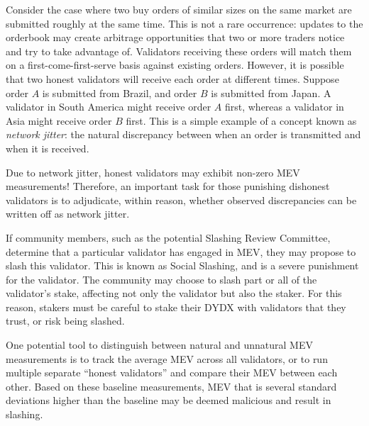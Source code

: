            Consider the case where two buy orders of similar sizes on the same market are submitted roughly at the same time. This is not a rare occurrence: updates to the orderbook may create arbitrage opportunities that two or more traders notice and try to take advantage of. Validators receiving these orders will match them on a first-come-first-serve basis against existing orders. However, it is possible that two honest validators will receive each order at different times. Suppose order $A$ is submitted from Brazil, and order $B$ is submitted from Japan. A validator in South America might receive order $A$ first, whereas a validator in Asia might receive order $B$ first. This is a simple example of a concept known as \textit{network jitter}: the natural discrepancy between when an order is transmitted and when it is received.

            Due to network jitter, honest validators may exhibit non-zero MEV measurements! Therefore, an important task for those punishing dishonest validators is to adjudicate, within reason, whether observed discrepancies can be written off as network jitter.

            If community members, such as the potential Slashing Review Committee, determine that a particular validator has engaged in MEV, they may propose to slash this validator. This is known as Social Slashing, and is a severe punishment for the validator. The community may choose to slash part or all of the validator's stake, affecting not only the validator but also the staker. For this reason, stakers must be careful to stake their DYDX with validators that they trust, or risk being slashed.

            One potential tool to distinguish between natural and unnatural MEV measurements is to track the average MEV across all validators, or to run multiple separate ``honest validators'' and compare their MEV between each other. Based on these baseline measurements, MEV that is several standard deviations higher than the baseline may be deemed malicious and result in slashing.


